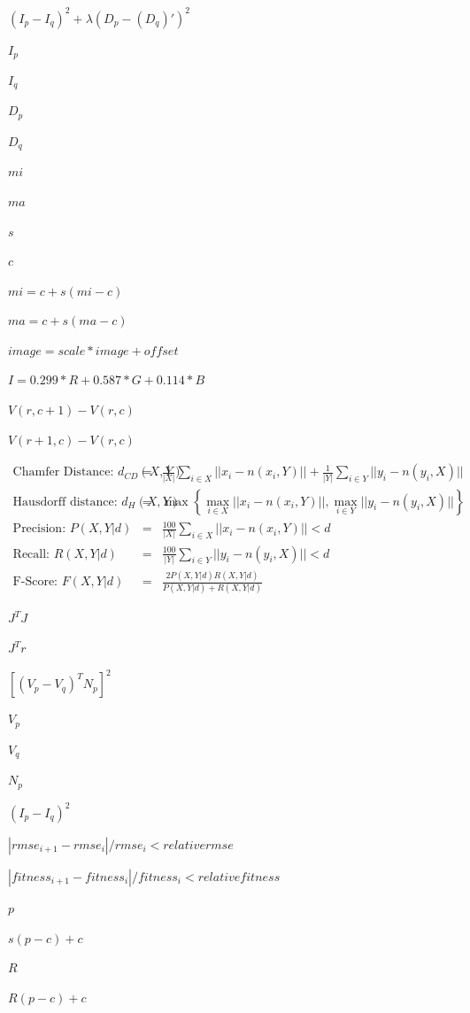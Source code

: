 \documentclass{article}
\begin{document}
$(I_p - I_q)^2 + \lambda(D_p - (D_q)')^2$
\pagebreak

$ I_p $
\pagebreak

$ I_q $
\pagebreak

$ D_p $
\pagebreak

$ D_q $
\pagebreak

$mi$
\pagebreak

$ma$
\pagebreak

$s$
\pagebreak

$c$
\pagebreak

$mi = c + s (mi - c)$
\pagebreak

$ma = c + s (ma - c)$
\pagebreak

$image = scale * image + offset$
\pagebreak

$I = 0.299 * R + 0.587 * G + 0.114 * B$
\pagebreak

$V(r, c+1)-V(r, c)$
\pagebreak

$V(r+1, c)-V(r, c)$
\pagebreak

\begin{eqnarray*} \text{Chamfer Distance: } d_{CD}(X,Y) &=& \frac{1}{|X|}\sum_{i \in X} || x_i - n(x_i, Y) || + \frac{1}{|Y|}\sum_{i \in Y} || y_i - n(y_i, X) || \\{} \text{Hausdorff distance: } d_H(X,Y) &=& \max \left\{ \max_{i \in X} || x_i - n(x_i, Y) ||, \max_{i \in Y} || y_i - n(y_i, X) || \right\} \\{} \text{Precision: } P(X,Y|d) &=& \frac{100}{|X|} \sum_{i \in X} || x_i - n(x_i, Y) || < d \\{} \text{Recall: } R(X,Y|d) &=& \frac{100}{|Y|} \sum_{i \in Y} || y_i - n(y_i, X) || < d \\{} \text{F-Score: } F(X,Y|d) &=& \frac{2 P(X,Y|d) R(X,Y|d)}{P(X,Y|d) + R(X,Y|d)} \end{eqnarray*}
\pagebreak

$J^T J$
\pagebreak

$J^T r$
\pagebreak

$[(V_p - V_q)^T N_p]^2$
\pagebreak

$ V_p $
\pagebreak

$ V_q $
\pagebreak

$ N_p $
\pagebreak

$(I_p - I_q)^2$
\pagebreak

$ |rmse_{i+1} - rmse_i|/rmse_i < relative rmse$
\pagebreak

$ |fitness_{i+1} - fitness_i|/fitness_i < relative fitness$
\pagebreak

$p$
\pagebreak

$s (p - c) + c$
\pagebreak

$R$
\pagebreak

$R (p - c) + c$
\pagebreak
\end{document}
